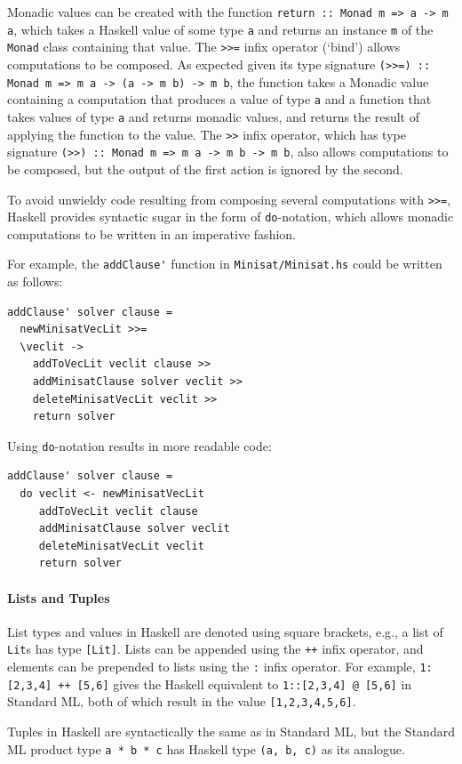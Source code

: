 \documentclass[12pt,a4paper,twoside,openright]{report}
\begin{document}
{Monadic values can be created with the function
\verb,return :: Monad m => a -> m a,, which takes a Haskell
value of some type \verb,a, and returns an instance \verb,m, of the
\verb,Monad, class containing that value.
The \verb,>>=, infix operator (`bind') allows computations to be composed.
As expected given its type signature
\verb,(>>=) :: Monad m => m a -> (a -> m b) -> m b,, the function
takes a Monadic value containing a computation that produces a value of type
\verb,a, and a function that takes values of type \verb,a, and returns
monadic values, and returns the result of applying the function to the value.
The \verb,>>, infix operator, which has type signature
\verb,(>>) :: Monad m => m a -> m b -> m b,, also allows computations to be composed,
but the output of the first action is ignored by the second.

To avoid unwieldy code resulting from composing several
computations with \verb,>>=,, Haskell provides syntactic sugar
in the form of \verb,do,-notation, which allows monadic computations
to be written in an imperative fashion.

For example, the \verb,addClause', function in \verb,Minisat/Minisat.hs, could
be written as follows:
\begin{lstlisting}
addClause' solver clause =
  newMinisatVecLit >>=
  \veclit ->
    addToVecLit veclit clause >> 
    addMinisatClause solver veclit >>
    deleteMinisatVecLit veclit >>
    return solver
\end{lstlisting}
Using \verb,do,-notation results in more readable code:
\begin{lstlisting}
addClause' solver clause =
  do veclit <- newMinisatVecLit
     addToVecLit veclit clause
     addMinisatClause solver veclit
     deleteMinisatVecLit veclit
     return solver
\end{lstlisting}
}

\paragraph{Lists and Tuples}{
List types and values in Haskell are denoted using square brackets, e.g.,
a list of \verb,Lit,s has type \verb,[Lit],.
Lists can be appended using the \verb,++, infix operator, and elements
can be prepended to lists using the \verb,:, infix operator.
For example, \verb.1:[2,3,4] ++ [5,6]. gives the Haskell equivalent to
\verb.1::[2,3,4] @ [5,6]. in Standard ML, both of which result in
the value \verb.[1,2,3,4,5,6]..

Tuples in Haskell are syntactically the same as in Standard ML, but the
Standard ML product type \verb,a * b * c, has Haskell type \verb.(a, b, c).
as its analogue.
}
\end{document}
